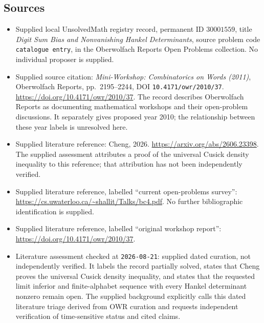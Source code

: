 \documentclass[11pt]{article}
\begin{document}
\subsection{Sources}
\begin{itemize}
\item Supplied local UnsolvedMath registry record, permanent ID \(30001559\), title \emph{Digit Sum Bias and Nonvanishing Hankel Determinants}, source problem code \texttt{catalogue entry}, in the Oberwolfach Reports Open Problems collection. No individual proposer is supplied.
\item Supplied source citation: \emph{Mini-Workshop: Combinatorics on Words (2011)}, Oberwolfach Reports, pp.~2195--2244, DOI \texttt{10.4171/owr/2010/37}. \url{https://doi.org/10.4171/owr/2010/37}. The record describes Oberwolfach Reports as documenting mathematical workshops and their open-problem discussions. It separately gives proposed year 2010; the relationship between these year labels is unresolved here.
\item Supplied literature reference: Cheng, 2026. \url{https://arxiv.org/abs/2606.23398}. The supplied assessment attributes a proof of the universal Cusick density inequality to this reference; that attribution has not been independently verified.
\item Supplied literature reference, labelled ``current open-problems survey'': \url{https://cs.uwaterloo.ca/~shallit/Talks/bc4.pdf}. No further bibliographic identification is supplied.
\item Supplied literature reference, labelled ``original workshop report'': \url{https://doi.org/10.4171/owr/2010/37}.
\item Literature assessment checked at \texttt{2026-08-21}: supplied dated curation, not independently verified. It labels the record partially solved, states that Cheng proves the universal Cusick density inequality, and states that the requested limit inferior and finite-alphabet sequence with every Hankel determinant nonzero remain open. The supplied background explicitly calls this dated literature triage derived from OWR curation and requests independent verification of time-sensitive status and cited claims.
\end{itemize}
\end{document}
